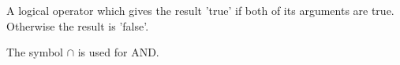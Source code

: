 A logical operator which gives the result 'true' if both of its
arguments are true. Otherwise the result is 'false'.
\par
The symbol $ \cap $ is used for AND.